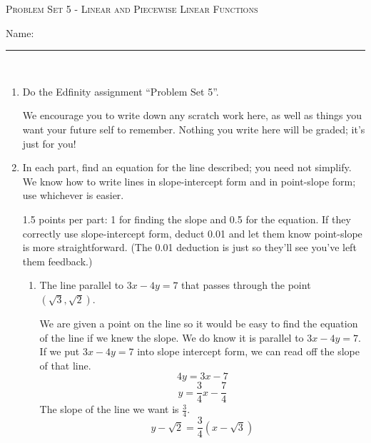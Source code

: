 \documentclass{article}
\newcommand{\doedfinity}[2][\newpage]{
  \begin{problem}[#1]
    Do the Edfinity assignment ``Problem Set #2''.

    We encourage you to write down any scratch work here, as well as
    things you want your future self to remember. Nothing you write
    here will be graded; it's just for you!
  \end{problem}
}
\begin{document}
\begin{center}
  \large\textsc{Problem Set 5 - Linear and Piecewise Linear Functions}\vspace{.5in}
  
   \large Name: \rule{5cm}{0.15mm}\\
\end{center}

\begin{enumerate}
\item 


  \doedfinity{5}

\item 

  In each part, find an equation for the line described; you need not simplify. We know how to write lines in slope-intercept form and in point-slope form; use whichever is easier. 

  \begin{grading}
    1.5 points per part: 1 for finding the slope and 0.5 for the equation. If they correctly use slope-intercept form, deduct 0.01 and let them know point-slope is more straightforward. (The 0.01 deduction is just so they'll see you've left them feedback.) 
  \end{grading}

  \begin{enumerate}

  \item
    \begin{problem}[\vfill]
      The line parallel to $3x-4y=7$ that passes through the point $(\sqrt{3}, \sqrt{2})$.
    \end{problem}

    \begin{solution} 
      We are given a point on the line so it would be easy to find the equation of the line if we knew the slope. We do know it is parallel to $3x-4y =7$. If we put  $3x-4y =7$ into slope intercept form, we can read off the slope of that line. $$4y = 3x-7$$ 
      $$ y = \frac{3}{4}x -\frac{7}{4}$$ 
      The slope of the line we want is $\frac{3}{4}$.
      $$ \boxed{y - \sqrt{2} = \frac{3}{4} (x- \sqrt{3})}$$
    \end{solution}


\end{enumerate}
\end{enumerate}
\end{document}
